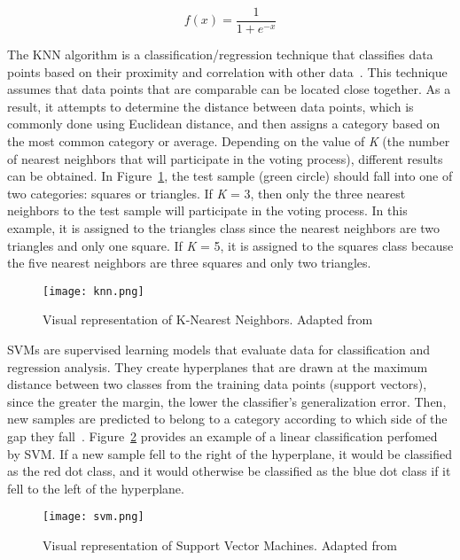 \begin{equation}\label{eq:5}
    f(x) = \frac{1}{1+e^{-x}}
\end{equation}


The \gls{KNN} algorithm is a classification/regression technique that classifies data points based on their proximity and correlation with other data~\cite{2020WhatIBM}. This technique assumes that data points that are comparable can be located close together. As a result, it attempts to determine the distance between data points, which is commonly done using Euclidean distance, and then assigns a category based on the most common category or average. Depending on the value of \textit{K} (the number of nearest neighbors that will participate in the voting process), different results can be obtained. In Figure~\ref{fig:knn}, the test sample (green circle) should fall into one of two categories: squares or triangles. If \textit{K} = 3, then only the three nearest neighbors to the test sample will participate in the voting process. In this example, it is assigned to the triangles class since the nearest neighbors are two triangles and only one square. If \textit{K} = 5, it is assigned to the squares class because the five nearest neighbors are three squares and only two triangles.

\begin{figure}[htbp]
    \centering
    \texttt{[image: knn.png]}
    \caption{Visual representation of K-Nearest Neighbors. Adapted from~\cite{Bronshtein2017AMedium}}
    \label{fig:knn}
\end{figure}

\gls{SVM}s are supervised learning models that evaluate data for classification and regression analysis. They create hyperplanes that are drawn at the maximum distance between two classes from the training data points (support vectors), since the greater the margin, the lower the classifier's generalization error. Then, new samples are predicted to belong to a category according to which side of the gap they fall~\cite{Mahesh2019MachineReview}. Figure~\ref{fig:svm} provides an example of a linear classification perfomed by \gls{SVM}. If a new sample fell to the right of the hyperplane, it would be classified as the red dot class, and it would otherwise be classified as the blue dot class if it fell to the left of the hyperplane. 

\begin{figure}[htbp]
    \centering
    \texttt{[image: svm.png]}
    \caption{Visual representation of Support Vector Machines. Adapted from~\cite{MaquinaExplicada}}
    \label{fig:svm}
\end{figure}

